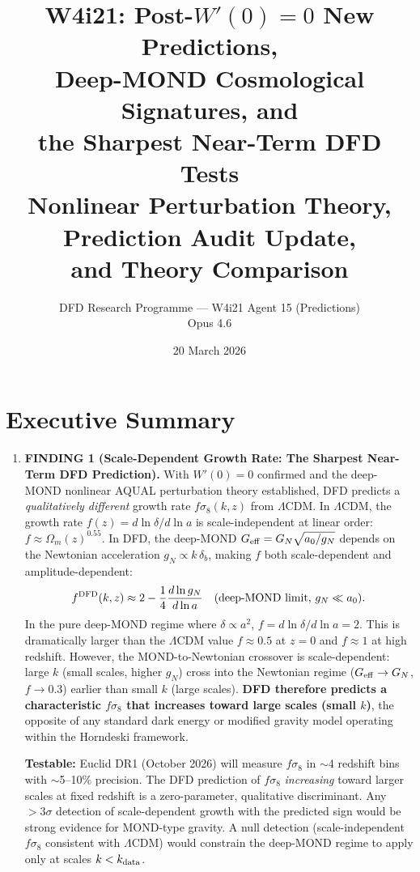 \documentclass[11pt]{article}
\title{\textbf{W4i21: Post-$W'(0)=0$ New Predictions,\\
Deep-MOND Cosmological Signatures, and\\
the Sharpest Near-Term DFD Tests}\\[6pt]
{\large Nonlinear Perturbation Theory, Prediction Audit Update,\\
and Theory Comparison}}
\author{DFD Research Programme --- W4i21 Agent 15 (Predictions)\\
Opus 4.6}
\date{20 March 2026}
\newcommand{\LCDM}{$\Lambda$CDM}
\newcommand{\Geff}{G_{\rm eff}}
\newcommand{\aM}{a_0}
\begin{document}
\maketitle

\section*{Executive Summary}

\begin{tcolorbox}[colback=blue!5!white, colframe=blue!70!black,
  title=\textbf{TOP 5 FINDINGS (Ranked by Impact on DFD Programme)}]

\begin{enumerate}

\item \textbf{FINDING 1 (Scale-Dependent Growth Rate: The Sharpest
  Near-Term DFD Prediction).}
  With $W'(0) = 0$ confirmed and the deep-MOND nonlinear AQUAL
  perturbation theory established, DFD predicts a \emph{qualitatively
  different} growth rate $f\sigma_8(k,z)$ from \LCDM.  In \LCDM, the
  growth rate $f(z) = d\ln\delta/d\ln a$ is scale-independent at
  linear order: $f \approx \Omega_m(z)^{0.55}$.  In DFD, the
  deep-MOND $\Geff = G_N\sqrt{\aM/g_N}$ depends on the Newtonian
  acceleration $g_N \propto k\,\delta_b$, making $f$ both
  scale-dependent and amplitude-dependent:
  \begin{equation}
  f^{\rm DFD}(k,z) \approx 2 - \frac{1}{4}\frac{d\ln g_N}{d\ln a}
  \quad\text{(deep-MOND limit, } g_N \ll \aM\text{)}.
  \end{equation}
  In the pure deep-MOND regime where $\delta \propto a^2$,
  $f = d\ln\delta/d\ln a = 2$.  This is dramatically larger than the
  \LCDM{} value $f \approx 0.5$ at $z = 0$ and $f \approx 1$ at high
  redshift.  However, the MOND-to-Newtonian crossover is
  scale-dependent: large $k$ (small scales, higher $g_N$) cross into
  the Newtonian regime ($\Geff \to G_N$, $f \to 0.3$) earlier than
  small $k$ (large scales).  \textbf{DFD therefore predicts a
  characteristic $f\sigma_8$ that increases toward large scales
  (small $k$)}, the opposite of any standard dark energy or modified
  gravity model operating within the Horndeski framework.

  \textbf{Testable:} Euclid DR1 (October 2026) will measure
  $f\sigma_8$ in $\sim$4 redshift bins with $\sim$5--10\% precision.
  The DFD prediction of $f\sigma_8$ \emph{increasing} toward larger
  scales at fixed redshift is a zero-parameter, qualitative
  discriminant.  Any $>3\sigma$ detection of scale-dependent growth
  with the predicted sign would be strong evidence for MOND-type
  gravity.  A null detection (scale-independent $f\sigma_8$ consistent
  with \LCDM) would constrain the deep-MOND regime to apply only at
  scales $k < k_{\rm data}$.


\end{enumerate}
\end{tcolorbox}
\end{document}
